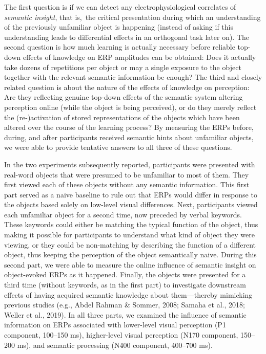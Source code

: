 \documentclass[
  english,
  man,floatsintext]{apa7}
\begin{document}
The first question is if we can detect any electrophysiological correlates of \emph{semantic insight}, that is,~the critical presentation during which an understanding of the previously unfamiliar object is happening (instead of asking if this understanding leads to differential effects in an orthogonal task later on). The second question is how much learning is actually necessary before reliable top-down effects of knowledge on ERP amplitudes can be obtained: Does it actually take dozens of repetitions per object or may a single exposure to the object together with the relevant semantic information be enough? The third and closely related question is about the nature of the effects of knowledge on perception: Are they reflecting genuine top-down effects of the semantic system altering perception online (while the object is being perceived), or do they merely reflect the (re-)activation of stored representations of the objects which have been altered over the course of the learning process? By measuring the ERPs before, during, and after participants received semantic hints about unfamiliar objects, we were able to provide tentative answers to all three of these questions.

In the two experiments subsequently reported, participants were presented with real-word objects that were presumed to be unfamiliar to most of them. They first viewed each of these objects without any semantic information. This first part served as a naive baseline to rule out that ERPs would differ in response to the objects based solely on low-level visual differences. Next, participants viewed each unfamiliar object for a second time, now preceded by verbal keywords. These keywords could either be matching the typical function of the object, thus making it possible for participants to understand what kind of object they were viewing, or they could be non-matching by describing the function of a different object, thus keeping the perception of the object semantically naive. During this second part, we were able to measure the online influence of semantic insight on object-evoked ERPs as it happened. Finally, the objects were presented for a third time (without keywords, as in the first part) to investigate downstream effects of having acquired semantic knowledge about them---thereby mimicking previous studies (e.g., Abdel Rahman \& Sommer, 2008; Samaha et al., 2018; Weller et al., 2019). In all three parts, we examined the influence of semantic information on ERPs associated with lower-level visual perception (P1 component, 100--150 ms), higher-level visual perception (N170 component, 150--200 ms), and semantic processing (N400 component, 400--700 ms).
\end{document}
